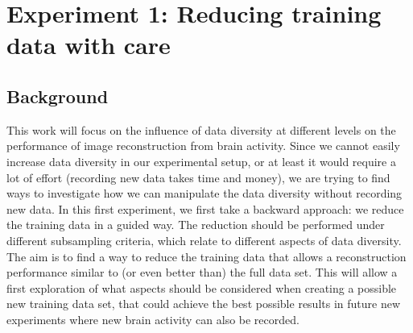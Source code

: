 \section{Experiment 1: Reducing training data with care}


\subsection{Background}

This work will focus on the influence of data diversity at different levels on the performance of image reconstruction from  brain activity. Since we cannot easily increase data diversity in our experimental setup, or at least it would require a lot of effort (recording new data takes time and money), we are trying to find ways to investigate how we can manipulate the data diversity  without recording new data. In this first experiment, we first take a backward approach: we reduce the training data in a guided way. The reduction should be performed under different subsampling criteria, which relate to different aspects of data diversity. The aim is to find a way to reduce the training data that allows a reconstruction performance similar to (or even better than) the full data set. This will allow a first exploration of what aspects should be considered when creating a possible new training data set, that could achieve the best possible results in future new experiments where new brain activity can also be recorded. 

